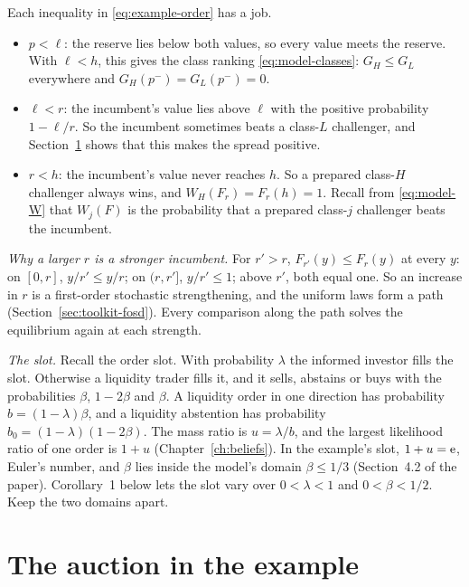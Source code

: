 Each inequality in \eqref{eq:example-order} has a job.
\begin{itemize}
\item \(p<\ell\): the reserve lies below both values, so every value meets the reserve. With \(\ell<h\), this gives
  the class ranking \eqref{eq:model-classes}: \(G_H\le G_L\) everywhere and \(G_H(p^-)=G_L(p^-)=0\).
\item \(\ell<r\): the incumbent's value lies above \(\ell\) with the positive probability \(1-\ell/r\). So the
  incumbent sometimes beats a class-\(L\) challenger, and Section~\ref{sec:example-auction} shows that this makes
  the spread positive.
\item \(r<h\): the incumbent's value never reaches \(h\). So a prepared class-\(H\) challenger always wins, and
  \(W_H(F_r)=F_r(h)=1\). Recall from \eqref{eq:model-W} that \(W_j(F)\) is the probability that a prepared class-\(j\)
  challenger beats the incumbent.
\end{itemize}

\emph{Why a larger \(r\) is a stronger incumbent.} For \(r'>r\), \(F_{r'}(y)\le F_r(y)\) at every \(y\): on
\([0,r]\), \(y/r'\le y/r\); on \((r,r']\), \(y/r'\le1\); above \(r'\), both equal one. So an increase in \(r\) is a
first-order stochastic strengthening, and the uniform laws form a path (Section~\ref{sec:toolkit-fosd}). Every
comparison along the path solves the equilibrium again at each strength.

\emph{The slot.} Recall the order slot. With probability \(\lambda\) the informed investor fills the slot. Otherwise
a liquidity trader fills it, and it sells, abstains or buys with the probabilities \(\beta\), \(1-2\beta\) and
\(\beta\). A liquidity order in one direction has probability \(b=(1-\lambda)\beta\), and a liquidity abstention
has probability \(b_0=(1-\lambda)(1-2\beta)\). The mass ratio is \(u=\lambda/b\), and the largest likelihood ratio of
one order is \(1+u\) (Chapter~\ref{ch:beliefs}). In the example's slot, \(1+u=\mathrm{e}\), Euler's number, and \(\beta\)
lies inside the model's domain \(\beta\le1/3\) (Section~4.2 of the paper). Corollary~1 below lets the slot vary over
\(0<\lambda<1\) and \(0<\beta<1/2\). Keep the two domains apart.

\section{The auction in the example}\label{sec:example-auction}

